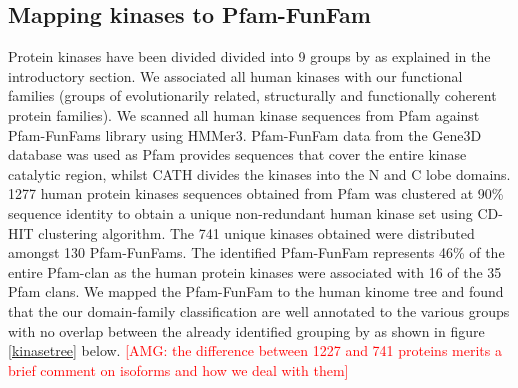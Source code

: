 \documentclass[a4paper, 11pt]{article}
\newcommand{\redcomment}[1]{\textcolor{red}{[#1]}} %
\begin{document}
\subsection*{Mapping kinases to Pfam-FunFam}
Protein kinases have been divided divided into 9 groups by \cite{manning2002protein} as explained in the introductory section. We associated all human kinases with our functional families (groups of evolutionarily related, structurally and functionally coherent protein families). We scanned all human kinase sequences from Pfam against Pfam-FunFams library using HMMer3. Pfam-FunFam data from the Gene3D database was used as Pfam provides sequences that cover the entire kinase catalytic region, whilst CATH divides the kinases into the N and C lobe domains.\\
1277 human protein kinases sequences obtained from Pfam was clustered at 90\% sequence identity to obtain a unique non-redundant human kinase set using CD-HIT clustering algorithm. The 741 unique kinases obtained were distributed amongst 130 Pfam-FunFams. The identified Pfam-FunFam represents 46\% of the entire Pfam-clan as the human protein kinases were associated with 16 of the 35 Pfam clans. We mapped the Pfam-FunFam to the human kinome tree and found that the our domain-family classification are well annotated to the various groups with no overlap between the already identified grouping by \cite{manning2002protein} as shown in figure \ref{kinasetree} below. \redcomment{AMG: the difference between 1227 and 741 proteins merits a brief comment on isoforms and how we deal with them}
\end{document}
